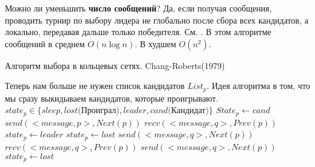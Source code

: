 Можно ли уменьшить \textbf{число сообщений}? Да, если получая сообщения, проводить турнир по выбору лидера не глобально после сбора всех кандидатов, а локально, передавая дальше только победителя. См. . В этом алгоритме сообщений в среднем $O(n\log n)$. В худшем $O(n^2)$.
\begin{algorithm}
\caption{Алгоритм выбора в кольцевых сетях. Chang-Roberts(1979)}
\label{algRoberts}
\begin{algorithmic}
\State Теперь нам больше не нужен список кандидатов $List_p$. Идея алгоритма в том, что мы сразу выкидываем кандидатов, которые проигрывают.
\State $state_p \in \{sleep, lost\text{(Проиграл)}, leader, cand\text{(Кандидат)}\}$ 
    \State $State_p \gets cand$
    \State $send(<message, p>, Next(p))$ 
        \State $recv(<message, q>, Prev(p))$ 
            $state_p \gets leader$
         
                \State $state_p \gets lost$
                \State $send(<message, q>, Next(p))$
            \EndIf
        \EndIf
    \EndWhile
\Else[Не инициаторы] 
        \State $recv(<message, q>, Prev(p))$ 
        \State $send(<message, q>, Next(p))$ 
            \State $state_p \gets lost$
        \EndIf
    \EndWhile
\EndIf 
\end{algorithmic}
\end{algorithm}

